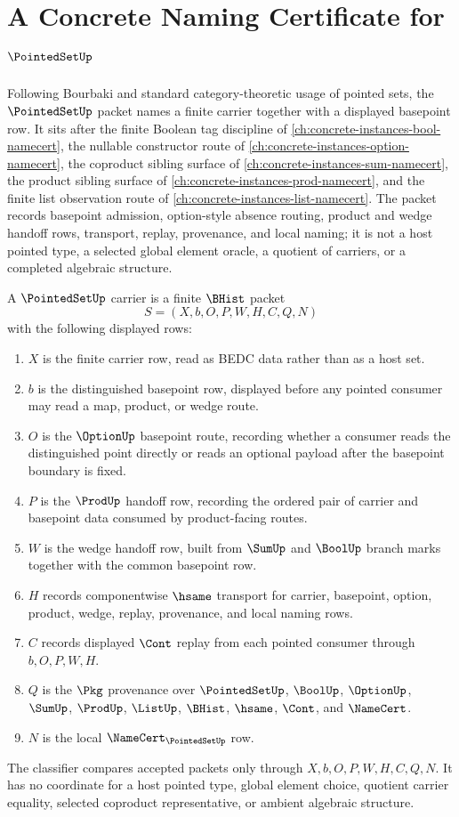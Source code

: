 \chapter{A Concrete Naming Certificate for $\PointedSetUp$}
\label{ch:concrete-instances-pointed-set-namecert}

Following Bourbaki and standard category-theoretic usage of pointed sets, the $\PointedSetUp$ packet names a finite carrier together with a displayed basepoint row. It sits after the finite Boolean tag discipline of \autoref{ch:concrete-instances-bool-namecert}, the nullable constructor route of \autoref{ch:concrete-instances-option-namecert}, the coproduct sibling surface of \autoref{ch:concrete-instances-sum-namecert}, the product sibling surface of \autoref{ch:concrete-instances-prod-namecert}, and the finite list observation route of \autoref{ch:concrete-instances-list-namecert}. The packet records basepoint admission, option-style absence routing, product and wedge handoff rows, transport, replay, provenance, and local naming; it is not a host pointed type, a selected global element oracle, a quotient of carriers, or a completed algebraic structure.

\begin{definition}
\label{def:pointed-set-carrier}
A $\PointedSetUp$ carrier is a finite $\BHist$ packet
$$
S=(X,b,O,P,W,H,C,Q,N)
$$
with the following displayed rows:
\begin{enumerate}
\item $X$ is the finite carrier row, read as BEDC data rather than as a host set.
\item $b$ is the distinguished basepoint row, displayed before any pointed consumer may read a map, product, or wedge route.
\item $O$ is the $\OptionUp$ basepoint route, recording whether a consumer reads the distinguished point directly or reads an optional payload after the basepoint boundary is fixed.
\item $P$ is the $\ProdUp$ handoff row, recording the ordered pair of carrier and basepoint data consumed by product-facing routes.
\item $W$ is the wedge handoff row, built from $\SumUp$ and $\BoolUp$ branch marks together with the common basepoint row.
\item $H$ records componentwise $\hsame$ transport for carrier, basepoint, option, product, wedge, replay, provenance, and local naming rows.
\item $C$ records displayed $\Cont$ replay from each pointed consumer through $b,O,P,W,H$.
\item $Q$ is the $\Pkg$ provenance over $\PointedSetUp$, $\BoolUp$, $\OptionUp$, $\SumUp$, $\ProdUp$, $\ListUp$, $\BHist$, $\hsame$, $\Cont$, and $\NameCert$.
\item $N$ is the local $\NameCert_{\PointedSetUp}$ row.
\end{enumerate}
The classifier compares accepted packets only through $X,b,O,P,W,H,C,Q,N$. It has no coordinate for a host pointed type, global element choice, quotient carrier equality, selected coproduct representative, or ambient algebraic structure.
\end{definition}


